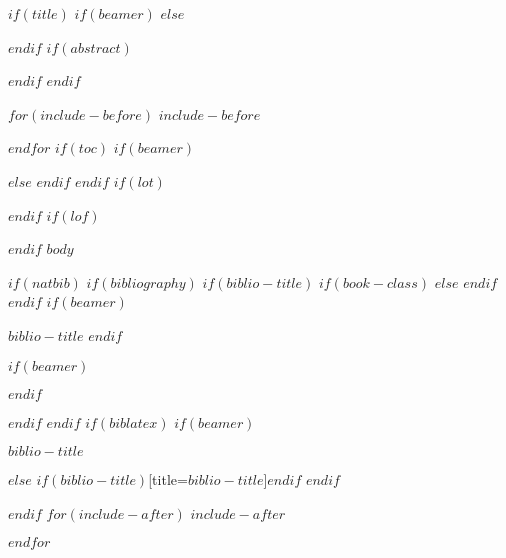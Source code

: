 \documentclass[a4paper,12pt]{article}
\begin{document}
$if(title)$
$if(beamer)$
\frame{\titlepage}
$else$
\maketitle
$endif$
$if(abstract)$
\begin{abstract}
$abstract$
\end{abstract}
$endif$
$endif$

$for(include-before)$
$include-before$

$endfor$
$if(toc)$
$if(beamer)$
\begin{frame}
\tableofcontents[hideallsubsections]
\end{frame}
$else$
{
\setcounter{tocdepth}{$toc-depth$}
\tableofcontents
}
$endif$
$endif$
$if(lot)$
\listoftables
$endif$
$if(lof)$
\listoffigures
$endif$
$body$

$if(natbib)$
$if(bibliography)$
$if(biblio-title)$
$if(book-class)$
\renewcommand\bibname{$biblio-title$}
$else$
\renewcommand\refname{$biblio-title$}
$endif$
$endif$
$if(beamer)$
\begin{frame}[allowframebreaks]{$biblio-title$}
\bibliographytrue
$endif$

$if(beamer)$
\end{frame}
$endif$

$endif$
$endif$
$if(biblatex)$
$if(beamer)$
\begin{frame}[allowframebreaks]{$biblio-title$}
\bibliographytrue
\printbibliography[heading=none]
\end{frame}
$else$
\printbibliography$if(biblio-title)$[title=$biblio-title$]$endif$
$endif$

$endif$
$for(include-after)$
$include-after$

$endfor$
\end{document}
